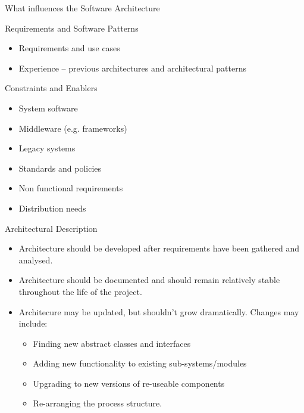 \documentclass[aspectratio=1610,xcolor=dvipsnames,t,compress]{beamer}
\begin{document}
\begin{frame}{What influences the Software Architecture} 
    \begin{block}{Requirements and Software Patterns} 
        \begin{itemize}
            \item Requirements and use cases
            \item Experience -- previous architectures and architectural patterns
        \end{itemize}
    \end{block}
    \begin{block}{Constraints and Enablers} 
        \begin{itemize}
            \item System software
            \item Middleware (e.g. frameworks)
            \item Legacy systems
            \item Standards and policies
            \item Non functional requirements
            \item Distribution needs
        \end{itemize}
    \end{block} 
\end{frame}

\begin{frame}{Architectural Description} 
    \begin{itemize}
        \item Architecture should be developed after requirements have been 
              gathered and analysed.
        \item Architecture should be documented and should remain relatively 
              stable throughout the life of the project.
        \item Architecure may be updated, but shouldn’t grow dramatically. 
              Changes may include:
              \begin{itemize} 
                    \item Finding new abstract classes and interfaces
                    \item Adding new functionality to existing sub-systems/modules
                    \item Upgrading to new versions of re-useable components
                    \item Re-arranging the process structure.
                \end{itemize}
    \end{itemize}
\end{frame} 
\end{document}
